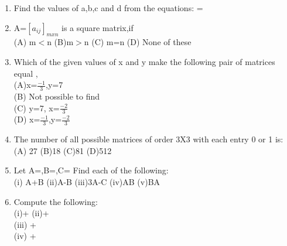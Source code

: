 \begin{enumerate}[label=\arabic*.,ref=\thesubsection.\theenumi]
\\
\solution 

\item Find the values of a,b,c and d from the equations:  = \\
\solution 

\item A=$[a_{ij}]_{mxn}$ is a square matrix,if\\
(A) m$<$n (B)m$>$n (C) m=n (D) None of these\\
\item Which of the given values of x and y make the following pair of matrices equal ,\\
(A)x=$\frac{-1}{3}$,y=7 \\
 (B) Not possible to find\\
(C) y=7, x=$\frac{-2}{3}$\\
 (D) x=$\frac{-1}{3}$,y=$\frac{-2}{3}$\\
\item The number of all possible matrices of order 3X3 with each entry 0 or 1 is:\\
(A) 27 (B)18 (C)81 (D)512\\
\item Let A=,B=,C=
Find each of the following:\\
(i) A+B  (ii)A-B  (iii)3A-C  (iv)AB  (v)BA\\
\item Compute the following:\\
(i)+ (ii)+ \\
  (iii) +\\ 
(iv) +\\

\end{enumerate}
